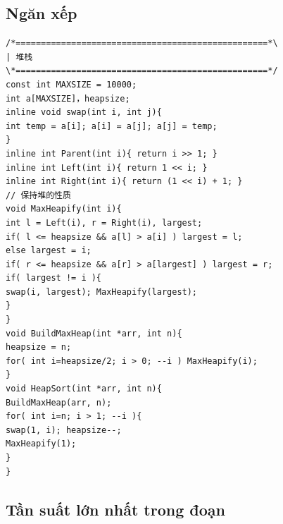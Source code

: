 \documentclass[11pt]{article}
\begin{document}
\subsection{Ngăn xếp}

\begingroup
\scriptsize
\begin{verbatim}
/*==================================================*\
| 堆栈
\*==================================================*/
const int MAXSIZE = 10000;
int a[MAXSIZE]，heapsize;
inline void swap(int i, int j){
int temp = a[i]; a[i] = a[j]; a[j] = temp;
}
inline int Parent(int i){ return i >> 1; }
inline int Left(int i){ return 1 << i; }
inline int Right(int i){ return (1 << i) + 1; }
// 保持堆的性质
void MaxHeapify(int i){
int l = Left(i), r = Right(i), largest;
if( l <= heapsize && a[l] > a[i] ) largest = l;
else largest = i;
if( r <= heapsize && a[r] > a[largest] ) largest = r;
if( largest != i ){
swap(i, largest); MaxHeapify(largest);
}
}
void BuildMaxHeap(int *arr, int n){
heapsize = n;
for( int i=heapsize/2; i > 0; --i ) MaxHeapify(i);
}
void HeapSort(int *arr, int n){
BuildMaxHeap(arr, n);
for( int i=n; i > 1; --i ){
swap(1, i); heapsize--;
MaxHeapify(1);
}
}
\end{verbatim}
\endgroup

\subsection{Tần suất lớn nhất trong đoạn}
\end{document}
